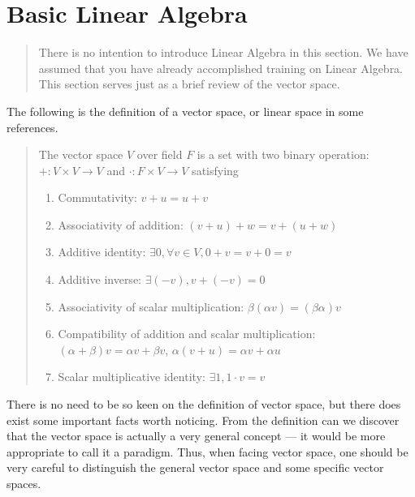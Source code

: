 \documentclass[letterpaper,10pt,english]{sphinxmanual}
\begin{document}
\section{Basic Linear Algebra}
\label{\detokenize{bg_linalg:basic-linear-algebra}}\label{\detokenize{bg_linalg::doc}}\begin{quote}

There is no intention to introduce Linear Algebra in this section. We have assumed that you have already accomplished training on Linear Algebra. This section serves just as a brief review of the vector space.
\end{quote}

The following is the definition of a vector space, or linear space in some references.
\begin{quote}

 The vector space \(V\) over field \(F\) is a set with two binary operation:  \(+:V\times V\rightarrow V\) and  \(\cdot:F\times V\rightarrow V\) satisfying
\begin{enumerate}
\item {} 
Commutativity: \(v+u=u+v\)

\item {} 
Associativity of addition: \((v+u)+w = v+(u+w)\)

\item {} 
Additive identity: \(\exists 0, \forall v\in V, 0+v=v+0=v\)

\item {} 
Additive inverse: \(\exists (-v), v + (-v) = 0\)

\item {} 
Associativity of scalar multiplication: \(\beta(\alpha v) = (\beta\alpha)v\)

\item {} 
Compatibility of addition and scalar multiplication: \((\alpha+\beta)v = \alpha v + \beta v\), \(\alpha(v+u) = \alpha v + \alpha u\)

\item {} 
Scalar multiplicative identity: \(\exists 1, 1\cdot v = v\)

\end{enumerate}
\end{quote}

There is no need to be so keen on the definition of vector space, but there does exist some important facts worth noticing. From the definition can we discover that the vector space is actually a very general concept --- it would be more appropriate to call it a paradigm. Thus, when facing vector space, one should be very careful to distinguish the general vector space and some specific vector spaces.
\end{document}
